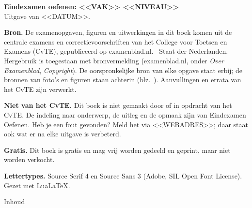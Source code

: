 \documentclass[11pt,twoside]{book}
\begin{document}
\thispagestyle{leeg}
\vspace*{\fill}
{\footnotesize\opmaakproza
{\sffamily\bfseries Eindexamen oefenen: <<VAK>> <<NIVEAU>>}\\
Uitgave van <<DATUM>>.

\textbf{Bron.} De examenopgaven, figuren en uitwerkingen in dit boek komen uit de centrale examens en
correctievoorschriften van het College voor Toetsen en Examens (CvTE), gepubliceerd op examenblad.nl.
\textcopyright\ Staat der Nederlanden. Hergebruik is toegestaan met bronvermelding
(examenblad.nl, onder \emph{Over Examenblad}, \emph{Copyright}). De oorspronkelijke bron van elke opgave staat erbij;
de bronnen van foto's en figuren staan achterin (blz.~\pageref{bronnen}). Aanvullingen en errata van het CvTE zijn verwerkt.

\textbf{Niet van het CvTE.} Dit boek is niet gemaakt door of in opdracht van het CvTE. De indeling naar onderwerp,
de uitleg en de opmaak zijn van Eindexamen Oefenen. Heb je een fout gevonden? Meld het via <<WEBADRES>>; daar staat ook wat er na elke uitgave is verbeterd.

\textbf{Gratis.} Dit boek is gratis en mag vrij worden gedeeld en geprint, maar niet worden verkocht.

\textbf{Lettertypes.} Source Serif 4 en Source Sans 3 (Adobe, SIL Open Font License). Gezet met Lua\LaTeX.\par}
\clearpage

\renewcommand\kopL{Inhoud}\renewcommand\kopR{Inhoud}
\label{inhoud}
{\sffamily\zwart\fontsize{19}{22}\selectfont Inhoud}\par\vskip 8pt
\clearpage
\end{document}
